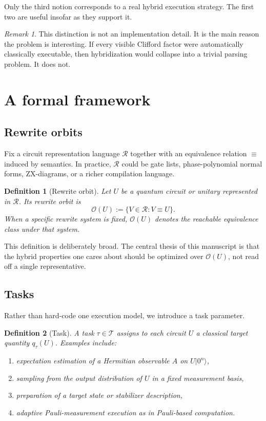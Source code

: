 \documentclass[11pt]{article}
\newtheorem{definition}{Definition}
\theoremstyle{remark}
\newtheorem{remark}{Remark}
\newcommand{\orbit}{\mathcal{O}}
\newcommand{\Task}{\mathcal{T}}
\begin{document}
Only the third notion corresponds to a real hybrid execution strategy. The first two are useful insofar as they support it.

\begin{remark}
This distinction is not an implementation detail. It is the main reason the problem is interesting. If every visible Clifford factor were automatically classically executable, then hybridization would collapse into a trivial parsing problem. It does not.
\end{remark}

\section{A formal framework}

\subsection{Rewrite orbits}

Fix a circuit representation language $\mathcal{R}$ together with an equivalence relation $\equiv$ induced by semantics. In practice, $\mathcal{R}$ could be gate lists, phase-polynomial normal forms, ZX-diagrams, or a richer compilation language.

\begin{definition}[Rewrite orbit]
Let $U$ be a quantum circuit or unitary represented in $\mathcal{R}$. Its \emph{rewrite orbit} is
\[
\orbit(U) := \{V \in \mathcal{R} : V \equiv U\}.
\]
When a specific rewrite system is fixed, $\orbit(U)$ denotes the reachable equivalence class under that system.
\end{definition}

This definition is deliberately broad. The central thesis of this manuscript is that the hybrid properties one cares about should be optimized over $\orbit(U)$, not read off a single representative.

\subsection{Tasks}

Rather than hard-code one execution model, we introduce a task parameter.

\begin{definition}[Task]
A \emph{task} $\tau \in \Task$ assigns to each circuit $U$ a classical target quantity $q_{\tau}(U)$. Examples include:
\begin{enumerate}[label=(\alph*), leftmargin=1.5em]
    \item expectation estimation of a Hermitian observable $A$ on $U|0^n\rangle$,
    \item sampling from the output distribution of $U$ in a fixed measurement basis,
    \item preparation of a target state or stabilizer description,
    \item adaptive Pauli-measurement execution as in Pauli-based computation.
\end{enumerate}
\end{definition}
\end{document}
